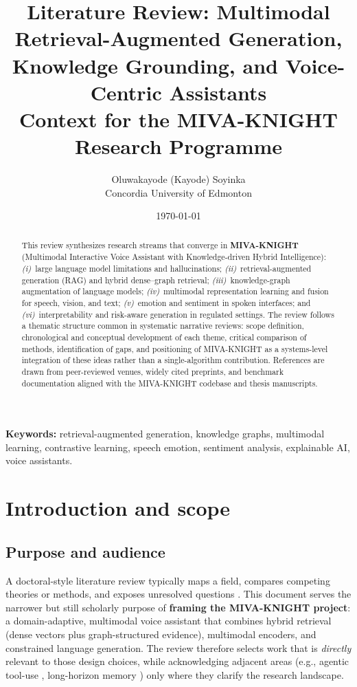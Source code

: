 \documentclass[12pt,a4paper]{article}
\title{\textbf{Literature Review: Multimodal Retrieval-Augmented Generation,\\
Knowledge Grounding, and Voice-Centric Assistants}\\
\large Context for the MIVA-KNIGHT Research Programme}
\author{Oluwakayode (Kayode) Soyinka\\
\small Concordia University of Edmonton}
\date{\today}
\begin{document}
\maketitle

\begin{abstract}
\noindent
This review synthesizes research streams that converge in \textbf{MIVA-KNIGHT} (Multimodal Interactive Voice Assistant with Knowledge-driven Hybrid Intelligence): \emph{(i)}~large language model limitations and hallucinations; \emph{(ii)}~retrieval-augmented generation (RAG) and hybrid dense--graph retrieval; \emph{(iii)}~knowledge-graph augmentation of language models; \emph{(iv)}~multimodal representation learning and fusion for speech, vision, and text; \emph{(v)}~emotion and sentiment in spoken interfaces; and \emph{(vi)}~interpretability and risk-aware generation in regulated settings. The review follows a thematic structure common in systematic narrative reviews: scope definition, chronological and conceptual development of each theme, critical comparison of methods, identification of gaps, and positioning of MIVA-KNIGHT as a systems-level integration of these ideas rather than a single-algorithm contribution. References are drawn from peer-reviewed venues, widely cited preprints, and benchmark documentation aligned with the MIVA-KNIGHT codebase and thesis manuscripts.
\end{abstract}

\noindent\textbf{Keywords:} retrieval-augmented generation, knowledge graphs, multimodal learning, contrastive learning, speech emotion, sentiment analysis, explainable AI, voice assistants.

\section{Introduction and scope}

\subsection{Purpose and audience}

A doctoral-style literature review typically maps a field, compares competing theories or methods, and exposes unresolved questions \cite{hart1998doing,boote2005students}. This document serves the narrower but still scholarly purpose of \textbf{framing the MIVA-KNIGHT project}: a domain-adaptive, multimodal voice assistant that combines hybrid retrieval (dense vectors plus graph-structured evidence), multimodal encoders, and constrained language generation. The review therefore selects work that is \emph{directly} relevant to those design choices, while acknowledging adjacent areas (e.g., agentic tool-use \cite{yao2023react}, long-horizon memory \cite{gutierrez2024hipporag}) only where they clarify the research landscape.
\end{document}
